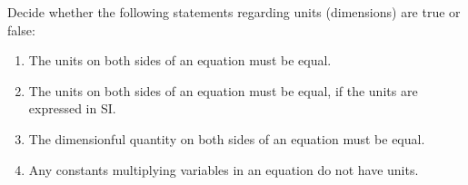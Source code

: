 Decide whether the following statements regarding units (dimensions) are true or false:
\begin{enumerate}
\item The units on both sides of an equation must be equal.
\item The units on both sides of an equation must be equal, if the units are expressed in SI.
\item The dimensionful quantity on both sides of an equation must be equal.
\item Any constants multiplying variables in an equation do not have units.
\end{enumerate}
